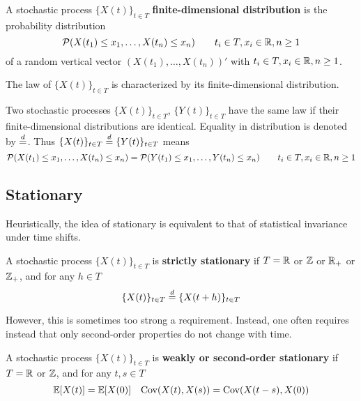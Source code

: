 \begin{definition}
	A stochastic process $\{X(t)\}_{t \in T}$ \textbf{finite-dimensional distribution} is the probability distribution
	\begin{equation}
		\mathcal{P}(X(t_1) \le x_1, \dots, X(t_n) \le x_n) \qquad t_i \in T, x_i \in \mathbb{R}, n \ge 1
	\end{equation} 
	of a random vertical vector $(X(t_1), \dots, X(t_n))'$ with $t_i \in T, x_i \in \mathbb{R}, n \ge 1$. 
\end{definition}

The law of $\{X(t)\}_{t \in T}$ is characterized by its finite-dimensional distribution.

Two stochastic processes $\{X(t)\}_{t \in T}$, $\{Y(t)\}_{t \in T}$ have the same law if their finite-dimensional distributions are identical. Equality in distribution is denoted by $\overset{d}{=}$. Thus $\{X(t)\}_{t \in T} \overset{d}{=} \{Y(t)\}_{t \in T}$ means
\begin{equation}
	\mathcal{P}(X(t_1) \le x_1, \dots, X(t_n) \le x_n) = \mathcal{P}(Y(t_1) \le x_1, \dots, Y(t_n) \le x_n) \qquad t_i \in T, x_i \in \mathbb{R}, n \ge 1
\end{equation} 

\subsection{Stationary}
Heuristically, the idea of stationary is equivalent to that of statistical invariance under time shifts.
\begin{definition}\label{def:strictstationary} 
	A stochastic process $\{X (t)\}_{t \in T}$ is \textbf{strictly stationary} if $T = \mathbb{R}$ or $\mathbb{Z}$ or $\mathbb{R}_+$ or $\mathbb{Z}_+$, and for any $h \in T$
	\begin{equation}
		\{X(t)\}_{t \in T} \overset{d}{=} \{X(t + h)\}_{t \in T} 
	\end{equation}
\end{definition}

However, this is sometimes too strong a requirement. Instead, one often requires instead that only second-order properties do not change with time.
\begin{definition}
	A stochastic process $\{X (t)\}_{t \in T}$ is \textbf{weakly or second-order stationary} if $T = \mathbb{R}$ or $\mathbb{Z}$, and for any $t, s \in T$
	\begin{equation}
		\mathbb{E}[X(t)] = \mathbb{E}[X(0)] \quad \textnormal{Cov}(X(t), X(s)) = \textnormal{Cov}(X(t-s), X(0))
	\end{equation}
\end{definition}

